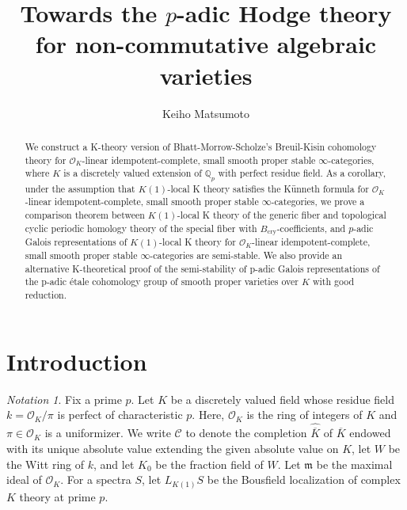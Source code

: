 \documentclass[11pt]{amsart}
\title[$p$-adic Hodge theory]{Towards the $p$-adic Hodge theory for non-commutative algebraic varieties}\author{Keiho Matsumoto}
\newcommand{\Q}{\mathbb{Q}}
\newcommand{\sO}{\mathcal{O}}
\newcommand{\Bcry}{B_{\operatorname{cry}}}
\newcommand{\Cu}{\mathcal{C}}
\newcounter{spec}
\theoremstyle{definition}
\theoremstyle{remark}
\numberwithin{equation}{section}
\newtheorem{notation}[lemma]{Notation}
\newcommand{\mf}{\mathfrak}
\begin{document}
\maketitle

\begin{abstract}
We construct a K-theory version of Bhatt-Morrow-Scholze's Breuil-Kisin cohomology theory for $\sO_K$-linear idempotent-complete, small smooth proper stable $\infty$-categories, where $K$ is a discretely valued extension of $\Q_p$ with perfect residue field. As a corollary, under the assumption that $K(1)$-local K theory satisfies the K\"unneth formula for $\sO_K$-linear idempotent-complete, small smooth proper stable $\infty$-categories, we prove a comparison theorem between $K(1)$-local K theory of the generic fiber and topological cyclic periodic homology theory of the special fiber with $\Bcry$-coefficients, and $p$-adic Galois representations of $K(1)$-local K theory for $\sO_K$-linear idempotent-complete, small smooth proper stable $\infty$-categories are semi-stable. We also provide an alternative K-theoretical proof of the semi-stability of p-adic Galois representations of the p-adic \'etale cohomology group of smooth proper varieties over $K$ with good reduction.
\end{abstract}
\section{Introduction}
\begin{notation}
Fix a prime $p$. Let $K$ be a discretely valued field whose residue field $k=\sO_K/\pi$ is perfect of characteristic $p$. Here, $\sO_K$ is the ring of integers of $K$ and $\pi\in \sO_K$ is a uniformizer. We write $\Cu$ to denote the completion $\hat{\overline{K}}$ of $\overline{K}$ endowed with its unique absolute value extending the given absolute value on $K$, let $W$ be the Witt ring of $k$, and let $K_0$ be the fraction field of $W$. Let $\mf{m}$ be the maximal ideal of $\sO_K$. For a spectra $S$, let $L_{K(1)}S$ be the Bousfield localization of complex $K$ theory at prime $p$.
\end{notation}
\end{document}
